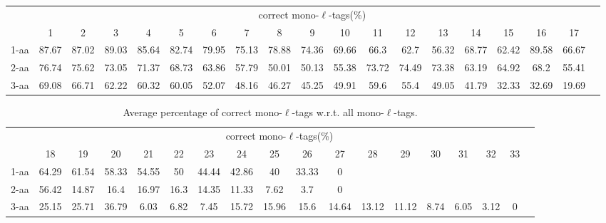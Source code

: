 \documentclass{article}
\begin{document}
\begin{table}[h]\tiny
\vspace{3mm}
{\centering
\begin{center}
\begin{tabular}{|l|c|c|c|c|c|c|c|c|c|c|c|c|c|c|c|c|c|c|}
  \hline
  & \multicolumn{ 17 }{|c|}{correct mono-$\ell$-tags(\%)} \\
  \cline{2- 18}
    & 1 & 2 & 3 & 4 & 5 & 6 & 7 & 8 & 9 & 10 & 11 & 12 & 13 & 14 & 15 & 16 & 17\\
  \hline
1-aa  & 87.67 & 87.02 & 89.03 & 85.64 & 82.74 & 79.95 & 75.13 & 78.88 & 74.36 & 69.66 & 66.3 & 62.7 & 56.32 & 68.77 & 62.42 & 89.58 & 66.67\\
2-aa  & 76.74 & 75.62 & 73.05 & 71.37 & 68.73 & 63.86 & 57.79 & 50.01 & 50.13 & 55.38 & 73.72 & 74.49 & 73.38 & 63.19 & 64.92 & 68.2 & 55.41\\
3-aa  & 69.08 & 66.71 & 62.22 & 60.32 & 60.05 & 52.07 & 48.16 & 46.27 & 45.25 & 49.91 & 59.6 & 55.4 & 49.05 & 41.79 & 32.33 & 32.69 & 19.69\\
 \hline
\end{tabular}
\end{center}
\par}
\centering

\vspace{3mm}
\label{table:table5}
\end{table}
\begin{table}[h]\tiny
\vspace{3mm}
{\centering
\begin{center}
\begin{tabular}{|l|c|c|c|c|c|c|c|c|c|c|c|c|c|c|c|c|c|}
  \hline
  & \multicolumn{ 16 }{|c|}{correct mono-$\ell$-tags(\%)} \\
  \cline{2- 17}
    & 18 & 19 & 20 & 21 & 22 & 23 & 24 & 25 & 26 & 27 & 28 & 29 & 30 & 31 & 32 & 33\\
  \hline
1-aa  & 64.29 & 61.54 & 58.33 & 54.55 & 50 & 44.44 & 42.86 & 40 & 33.33 & 0 &  &  &  &  &  & \\
2-aa  & 56.42 & 14.87 & 16.4 & 16.97 & 16.3 & 14.35 & 11.33 & 7.62 & 3.7 & 0 &  &  &  &  &  & \\
3-aa  & 25.15 & 25.71 & 36.79 & 6.03 & 6.82 & 7.45 & 15.72 & 15.96 & 15.6 & 14.64 & 13.12 & 11.12 & 8.74 & 6.05 & 3.12 & 0\\
 \hline
\end{tabular}
\end{center}
\par}
\centering

\caption{ Average percentage of correct mono-$\ell$-tags w.r.t. all mono-$\ell$-tags.}

\vspace{3mm}
\label{table:table5}
\end{table}
\end{document}
